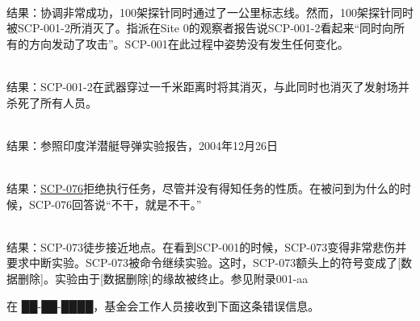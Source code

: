 \\
结果：协调非常成功，100架探针同时通过了一公里标志线。然而，100架探针同时被SCP-001-2所消灭了。指派在Site 0的观察者报告说SCP-001-2看起来“同时向所有的方向发动了攻击”。SCP-001在此过程中姿势没有发生任何变化。

\\
结果：SCP-001-2在武器穿过一千米距离时将其消灭，与此同时也消灭了发射场并杀死了所有人员。

\\
结果：参照印度洋潜艇导弹实验报告，2004年12月26日

\\
结果：\hyperref[chap:SCP-076]{SCP-076}拒绝执行任务，尽管并没有得知任务的性质。在被问到为什么的时候，SCP-076回答说“不干，就是不干。”

\\
结果：SCP-073徒步接近地点。在看到SCP-001的时候，SCP-073变得非常悲伤并要求中断实验。SCP-073被命令继续实验。这时，SCP-073额头上的符号变成了{[}数据删除]。实验由于{[}数据删除]的缘故被终止。参见附录001-aa


\hr

\hr

在 ██-██-████，基金会工作人员接收到下面这条错误信息。

